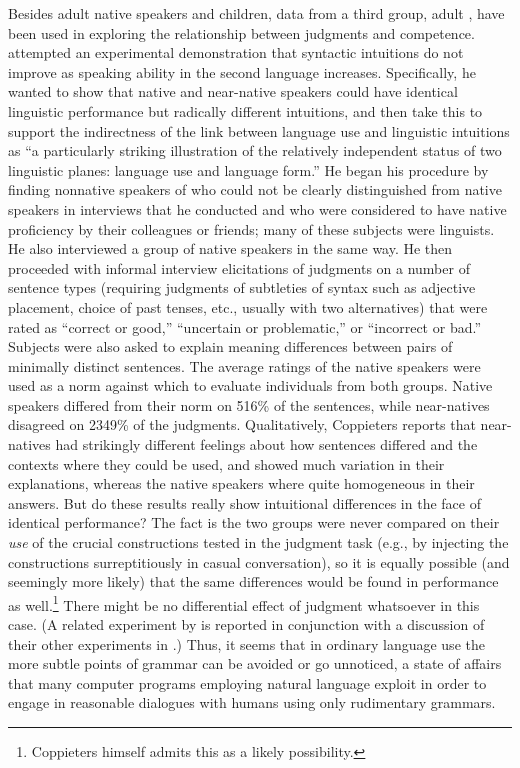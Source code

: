 Besides adult native speakers and children, data from a third group, adult , have been used in exploring the relationship between judgments and competence. \citet{Coppieters1987} attempted an experimental demonstration that syntactic intuitions do not improve as speaking ability in the second language increases. Specifically, he wanted to show that native and near-native speakers could have identical linguistic performance but radically different intuitions, and then take this to support the indirectness of the link between language use and linguistic intuitions as ``a particularly striking illustration of the relatively independent status of two linguistic planes: language use and language form.'' He began his procedure by finding nonnative speakers of  who could not be clearly distinguished from native speakers in interviews that he conducted and who were considered to have native proficiency by their colleagues or friends; many of these subjects were linguists. He also interviewed a group of native speakers in the same way. He then proceeded with informal interview elicitations of judgments on a number of sentence types (requiring judgments of subtleties of  syntax such as adjective placement, choice of past tenses, etc., usually with two alternatives) that were rated as ``correct or good,'' ``uncertain or problematic,'' or ``incorrect or bad.'' Subjects were also asked to explain meaning differences between pairs of minimally distinct sentences. The average ratings of the native speakers were used as a norm against which to evaluate individuals from both groups. Native speakers differed from their norm on 5\textendash{}16\% of the sentences,
while near-natives disagreed on 23\textendash{}49\% of the judgments. Qualitatively, Coppieters reports that near-natives had strikingly different feelings about how sentences differed and the contexts where they could be used, and showed much variation in their explanations, whereas the native speakers where quite homogeneous in their answers. But do these results  really show intuitional  differences in the face of identical performance? The fact is the two groups were never compared on their \textit{use} of the crucial constructions tested in the judgment task (e.g., by injecting the constructions surreptitiously in casual conversation),  so it is equally possible (and seemingly more likely) that the same differences would be found in performance as well.\footnote{Coppieters himself admits this as a likely possibility.}
 There might be no differential effect of judgment whatsoever in this case. (A related experiment by \citet{SnowEtAl1977} is reported in conjunction with a discussion of their other experiments in .) Thus, it seems that in ordinary language use the more subtle points of grammar can be avoided or go unnoticed, a state of affairs that many computer programs employing natural language exploit in order to engage in reasonable dialogues with humans using only rudimentary  grammars.

